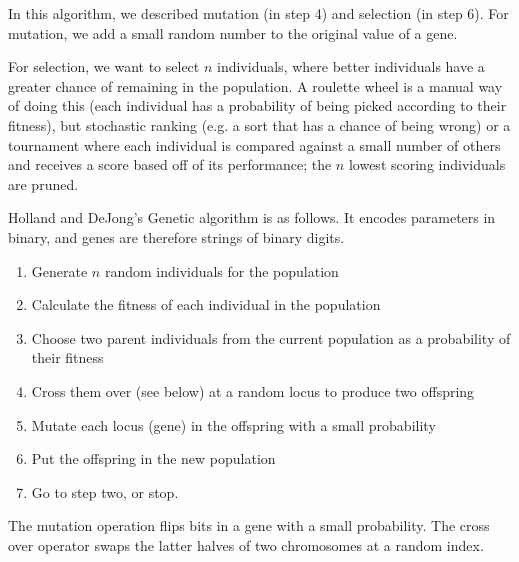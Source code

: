In this algorithm, we described mutation (in step 4) and selection (in step 6).
For mutation, we add a small random number to the original value of a gene.

For selection, we want to select $n$ individuals, where better
individuals have a greater chance of remaining in the population. A
roulette wheel is a manual way of doing this (each individual has a
probability of being picked according to their fitness), but
stochastic ranking (e.g. a sort that has a chance of being wrong) or a
tournament where each individual is compared against a small number of
others and receives a score based off of its performance; the $n$
lowest scoring individuals are pruned.

Holland and DeJong's Genetic algorithm is as follows. It encodes parameters in
binary, and genes are therefore strings of binary digits.

\begin{enumerate}
  \item Generate $n$ random individuals for the population
  \item Calculate the fitness of each individual in the population
  \item Choose two parent individuals from the current population as a 
  probability of their fitness
  \item Cross them over (see below) at a random locus to produce two offspring
  \item Mutate each locus (gene) in the offspring with a small probability
  \item Put the offspring in the new population
  \item Go to step two, or stop.
\end{enumerate}

The mutation operation flips bits in a gene with a small probability. The cross
over operator swaps the latter halves of two chromosomes at a random index.

\begin{center}
\end{center}

